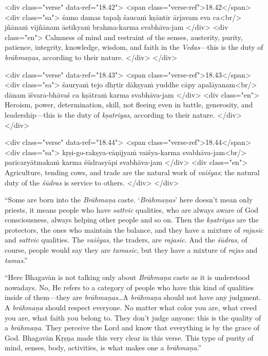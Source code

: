\begin{html}
<div class="verse" data-ref="18.42">
  <span class="verse-ref">18.42</span>
  <div class="sa">
    śamo damas tapaḥ śaucaṁ kṣāntir ārjavam eva ca<br/>
    jñānaṁ vijñānam āstikyaṁ brahma-karma svabhāva-jam
  </div>
  <div class="en">
    Calmness of mind and restraint of the senses, austerity, purity, patience, integrity, knowledge, wisdom, and faith in the \textit{Vedas}---this is the duty of \textit{brāhmaṇas}, according to their nature.
  </div>
</div>
\end{html}



\begin{html}
<div class="verse" data-ref="18.43">
  <span class="verse-ref">18.43</span>
  <div class="sa">
    śauryaṁ tejo dhṛtir dākṣyaṁ yuddhe cāpy apalāyanam<br/>
    dānam īśvara-bhāvaś ca kṣātraṁ karma svabhāva-jam
  </div>
  <div class="en">
    Heroism, power, determination, skill, not fleeing even in battle, generosity, and leadership---this is the duty of \textit{kṣatriyas}, according to their nature.
  </div>
</div>
\end{html}



\begin{html}
<div class="verse" data-ref="18.44">
  <span class="verse-ref">18.44</span>
  <div class="sa">
    kṛṣi-go-rakṣya-vāṇijyaṁ vaiśya-karma svabhāva-jam<br/>
    paricaryātmakaṁ karma śūdrasyāpi svabhāva-jam
  </div>
  <div class="en">
    Agriculture, tending cows, and trade are the natural work of \textit{vaiśyas}; the natural duty of the \textit{śūdras} is service to others.
  </div>
</div>
\end{html}


\enquote{Some are born into the \textit{Brāhmaṇa} caste. \enquote{\textit{Brāhmaṇas}} here doesn’t mean only priests, it means people who have \textit{sattvic} qualities, who are always aware of God consciousness, always helping other people and so on. Then the \textit{kṣatriyas} are the protectors, the ones who maintain the balance, and they have a mixture of \textit{rajasic} and \textit{sattvic} qualities. The \textit{vaiśyas}, the traders, are \textit{rajasic}. And the \textit{śūdras}, of course, people would say they are \textit{tamasic}, but they have a mixture of \textit{rajas} and \textit{tamas}.}

\enquote{Here Bhagavān is not talking only about \textit{Brāhmaṇa} caste as it is understood nowadays. No, He refers to a category of people who have this kind of qualities inside of them---they are \textit{brāhmaṇas}\ldots A \textit{brāhmaṇa} should not have any judgment. A \textit{brāhmaṇa} should respect everyone. No matter what color you are, what creed you are, what faith you belong to. They don’t judge anyone: this is the quality of a \textit{brāhmaṇa}. They perceive the Lord and know that everything is by the grace of God. Bhagavān Kṛṣṇa made this very clear in this verse. This type of purity of mind, senses, body, activities, is what makes one a \textit{brāhmaṇa}.}

